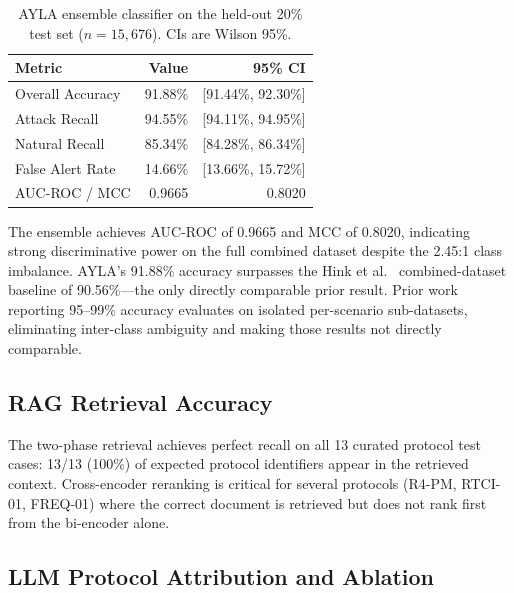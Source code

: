 \documentclass[twocolumn, 10pt, letterpaper]{article}
\begin{document}
\begin{table}[H]
\centering
\caption{AYLA ensemble classifier on the held-out 20\% test set
         ($n{=}15{,}676$). CIs are Wilson 95\%.}
\label{tab:classifier}
\small
\begin{tabular}{lrr}
\toprule
\textbf{Metric} & \textbf{Value} & \textbf{95\% CI} \\
\midrule
Overall Accuracy   & 91.88\% & [91.44\%, 92.30\%] \\
Attack Recall      & 94.55\% & [94.11\%, 94.95\%] \\
Natural Recall     & 85.34\% & [84.28\%, 86.34\%] \\
False Alert Rate   & 14.66\% & [13.66\%, 15.72\%] \\
AUC-ROC / MCC      & 0.9665  & 0.8020 \\
\bottomrule
\end{tabular}
\end{table}

The ensemble achieves AUC-ROC of 0.9665 and MCC of 0.8020, indicating strong
discriminative power on the full combined dataset despite the 2.45:1 class imbalance.
AYLA's 91.88\% accuracy surpasses the Hink et al.\ \cite{hink2014ml}
combined-dataset baseline of 90.56\%---the only directly comparable prior result.
Prior work reporting 95--99\% accuracy \cite{panthi2022ensemble,naeem2025deep,graphkan2025}
evaluates on isolated per-scenario sub-datasets, eliminating inter-class ambiguity
and making those results not directly comparable.

\subsection{RAG Retrieval Accuracy}

The two-phase retrieval achieves perfect recall on all 13 curated protocol test
cases: 13/13 (100\%) of expected protocol identifiers appear in the retrieved context.
Cross-encoder reranking is critical for several protocols (R4-PM, RTCI-01, FREQ-01)
where the correct document is retrieved but does not rank first from the bi-encoder alone.

\subsection{LLM Protocol Attribution and Ablation}
\end{document}
